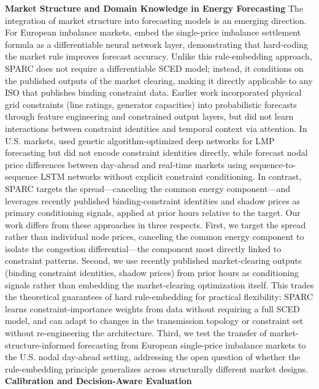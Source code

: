 \textbf{Market Structure and Domain Knowledge in Energy Forecasting}
The integration of market structure into forecasting models is an emerging direction. For European imbalance markets, \cite{yu2026marketruleinformed} embed the single-price imbalance settlement formula as a differentiable neural network layer, demonstrating that hard-coding the market rule improves forecast accuracy. Unlike this rule-embedding approach, SPARC does not require a differentiable SCED model; instead, it conditions on the published outputs of the market clearing, making it directly applicable to any ISO that publishes binding constraint data. Earlier work \cite{toubeau2021interpretable} incorporated physical grid constraints (line ratings, generator capacities) into probabilistic forecasts through feature engineering and constrained output layers, but did not learn interactions between constraint identities and temporal context via attention. In U.S. markets, \cite{hong2020locational} used genetic algorithm-optimized deep networks for LMP forecasting but did not encode constraint identities directly, while \cite{das2021forecasting} forecast nodal price differences between day-ahead and real-time markets using sequence-to-sequence LSTM networks without explicit constraint conditioning. In contrast, SPARC targets the spread---canceling the common energy component---and leverages recently published binding-constraint identities and shadow prices as primary conditioning signals, applied at prior hours relative to the target.
Our work differs from these approaches in three respects. First, we target the spread rather than individual node prices, canceling the common energy component to isolate the congestion differential---the component most directly linked to constraint patterns. Second, we use recently published market-clearing outputs (binding constraint identities, shadow prices) from prior hours as conditioning signals rather than embedding the market-clearing optimization itself. This trades the theoretical guarantees of hard rule-embedding for practical flexibility: SPARC learns constraint-importance weights from data without requiring a full SCED model, and can adapt to changes in the transmission topology or constraint set without re-engineering the architecture. Third, we test the transfer of market-structure-informed forecasting from European single-price imbalance markets to the U.S. nodal day-ahead setting, addressing the open question of whether the rule-embedding principle generalizes across structurally different market designs.
\textbf{Calibration and Decision-Aware Evaluation}
